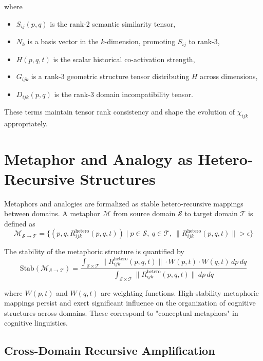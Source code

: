 where
\begin{itemize}
    \item \(S_{ij}(p, q)\) is the rank-2 semantic similarity tensor,
    \item \(N_k\) is a basis vector in the \(k\)-dimension, promoting \(S_{ij}\) to rank-3,
    \item \(H(p, q, t)\) is the scalar historical co-activation strength,
    \item \(G_{ijk}\) is a rank-3 geometric structure tensor distributing \(H\) across dimensions,
    \item \(D_{ijk}(p, q)\) is the rank-3 domain incompatibility tensor.
\end{itemize}

These terms maintain tensor rank consistency and shape the evolution of \(\chi_{ijk}\) appropriately.

\section{Metaphor and Analogy as Hetero-Recursive Structures}

Metaphors and analogies are formalized as stable hetero-recursive mappings between domains. A metaphor \(\mathcal{M}\) from source domain \(\mathcal{S}\) to target domain \(\mathcal{T}\) is defined as
\begin{equation}
\mathcal{M}_{\mathcal{S} \to \mathcal{T}} = \{(p, q, R_{ijk}^{\text{hetero}}(p, q, t)) \mid p \in \mathcal{S},\ q \in \mathcal{T},\ \|R_{ijk}^{\text{hetero}}(p, q, t)\| > \epsilon\}
\end{equation}

The stability of the metaphoric structure is quantified by
\begin{equation}
\text{Stab}(\mathcal{M}_{\mathcal{S} \to \mathcal{T}}) = \frac{\int_{\mathcal{S} \times \mathcal{T}} \|R_{ijk}^{\text{hetero}}(p, q, t)\| \cdot W(p, t) \cdot W(q, t) \, dp \, dq}{\int_{\mathcal{S} \times \mathcal{T}} \|R_{ijk}^{\text{hetero}}(p, q, t)\| \, dp \, dq}
\end{equation}

where \(W(p, t)\) and \(W(q, t)\) are weighting functions. High-stability metaphoric mappings persist and exert significant influence on the organization of cognitive structures across domains. These correspond to "conceptual metaphors" in cognitive linguistics.

\subsection{Cross-Domain Recursive Amplification}

